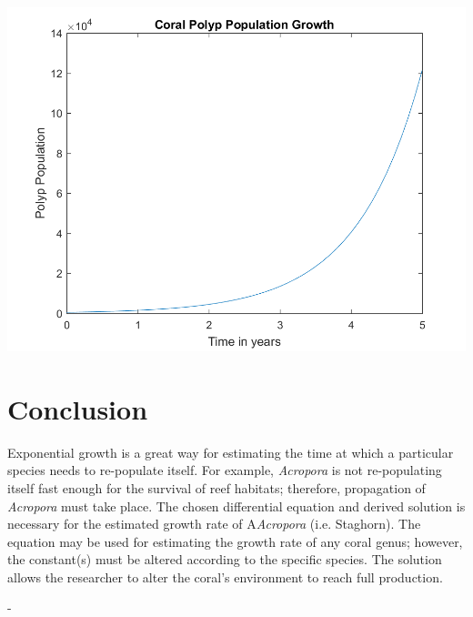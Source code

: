 \documentclass[12pt]{article}
\begin{document}
	\begin{center}
		\includegraphics[width=1\textwidth]{PolypPopGrowth}
	\end{center}
	
	\newpage

	\section{Conclusion}
	Exponential growth is a great way for estimating the time at which a particular species needs to re-populate itself. For example, \textit{Acropora} is not re-populating itself fast enough for the survival of reef habitats; therefore, propagation of \textit{Acropora} must take place. The chosen differential equation and derived solution is necessary for the estimated growth rate of A\textit{Acropora} (i.e. Staghorn). The equation may be used for estimating the growth rate of any coral genus; however, the constant(s) must be altered according to the specific species. The solution allows the researcher to alter the coral’s environment to reach full production.    
	



	\newpage
	
-	
	

	
	
\end{document}
